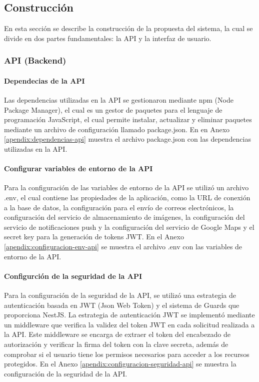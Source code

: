 \subsection{Construcción}

En esta sección se describe la construcción de la propuesta del sistema, la cual se divide en dos partes fundamentales: la API y la interfaz
de usuario.

\subsubsection{API (Backend)}

\paragraph{Dependecias de la API}
Las dependencias utilizadas en la API se gestionaron mediante npm (Node Package Manager), el cual es un gestor de paquetes para el lenguaje
de programación JavaScript, el cual permite instalar, actualizar y eliminar paquetes mediante un archivo de configuración llamado package.json.
En en Anexo \ref{apendix:dependencias-api} muestra el archivo package.json con las dependencias utilizadas en la API.

\paragraph{Configurar variables de entorno de la API}
Para la configuración de las variables de entorno de la API se utilizó un archivo .env, el cual contiene las propiedades de la
aplicación, como la URL de conexión a la base de datos, la configuración para el envío de correos electrónicos, la configuración del servicio de
almacenamiento de imágenes, la configuración del servicio de notificaciones push y la configuración del servicio de Google Maps y el secret key
para la generación de tokens JWT. En el Anexo \ref{apendix:configuracion-env-api} se muestra el archivo .env con las variables de entorno de la API.

\paragraph{Configurción de la seguridad de la API}
Para la configuración de la seguridad de la API, se utilizó una estrategia de autenticación basada en JWT (Json Web Token) y el sistema
de Guards que proporciona NestJS. La estrategia de autenticación JWT se implementó mediante un middleware que verifica la validez del
token JWT en cada solicitud realizada a la API. Este middleware se encarga de extraer el token del encabezado de autorización y verificar
la firma del token con la clave secreta, además de comprobar si el usuario tiene los permisos necesarios para acceder a los recursos
protegidos. En el Anexo \ref{apendix:configuracion-seguridad-api} se muestra la configuración de la seguridad de la API.

